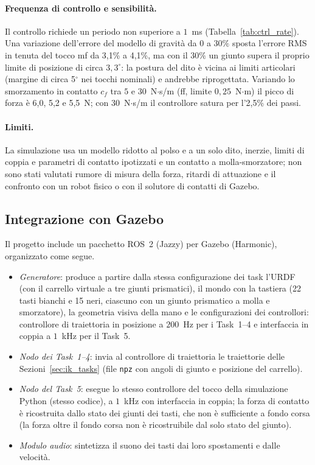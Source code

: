 \paragraph{Frequenza di controllo e sensibilità.} Il controllo richiede un periodo non superiore a $1$~ms (Tabella~\ref{tab:ctrl_rate}). Una variazione dell'errore del modello di gravità da $0$ a $30\%$ sposta l'errore RMS in tenuta del tocco mf da 3,1\% a 4,1\%, ma con il $30\%$ un giunto supera il proprio limite di posizione di circa $3,3^\circ$: la postura del dito è vicina ai limiti articolari (margine di circa 5$^\circ$ nei tocchi nominali) e andrebbe riprogettata. Variando lo smorzamento in contatto $c_f$ tra $5$ e $30$~N$\cdot$s/m (ff, limite $0{,}25$~N$\cdot$m) il picco di forza è 6,0, 5,2 e 5,5~N; con $30$~N$\cdot$s/m il controllore satura per l'2,5\% dei passi.

\paragraph{Limiti.} La simulazione usa un modello ridotto al polso e a un solo dito, inerzie, limiti di coppia e parametri di contatto ipotizzati e un contatto a molla-smorzatore; non sono stati valutati rumore di misura della forza, ritardi di attuazione e il confronto con un robot fisico o con il solutore di contatti di Gazebo.

\subsection{Integrazione con Gazebo}
\label{sec:val_gazebo}

Il progetto include un pacchetto ROS~2 (Jazzy) per Gazebo (Harmonic), organizzato come segue.
\begin{itemize}
    \item \emph{Generatore}: produce a partire dalla stessa configurazione dei task l'URDF (con il carrello virtuale a tre giunti prismatici), il mondo con la tastiera (22 tasti bianchi e 15 neri, ciascuno con un giunto prismatico a molla e smorzatore), la geometria visiva della mano e le configurazioni dei controllori: controllore di traiettoria in posizione a $200$~Hz per i Task~1--4 e interfaccia in coppia a $1$~kHz per il Task~5.
    \item \emph{Nodo dei Task~1--4}: invia al controllore di traiettoria le traiettorie delle Sezioni~\ref{sec:ik_tasks} (file \texttt{npz} con angoli di giunto e posizione del carrello).
    \item \emph{Nodo del Task~5}: esegue lo stesso controllore del tocco della simulazione Python (stesso codice), a $1$~kHz con interfaccia in coppia; la forza di contatto è ricostruita dallo stato dei giunti dei tasti, che non è sufficiente a fondo corsa (la forza oltre il fondo corsa non è ricostruibile dal solo stato del giunto).
    \item \emph{Modulo audio}: sintetizza il suono dei tasti dai loro spostamenti e dalle velocità.
\end{itemize}

